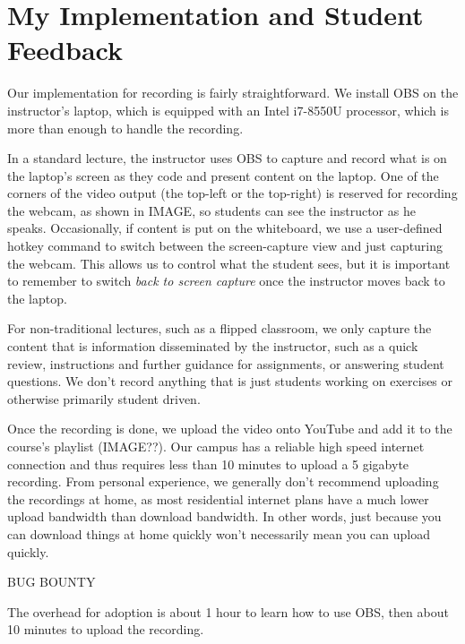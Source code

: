 \documentclass[sigconf]{acmart}
\begin{document}
\section{My Implementation and Student Feedback}
\label{implementation}

Our implementation for recording is fairly straightforward.
We install OBS \cite{bailey2017open} on the instructor's laptop, which is equipped with an Intel i7-8550U processor, which is more than enough to handle the recording.

In a standard lecture, the instructor uses OBS to capture and record what is on the laptop's screen as they code and present content on the laptop.
One of the corners of the video output (the top-left or the top-right) is reserved for recording the webcam, as shown in IMAGE, so students can see the instructor as he speaks.
Occasionally, if content is put on the whiteboard, we use a user-defined hotkey command to switch between the screen-capture view and just capturing the webcam.
This allows us to control what the student sees, but it is important to remember to switch \textit{back to screen capture} once the instructor moves back to the laptop.  

For non-traditional lectures, such as a flipped classroom, we only capture the content that is information disseminated by the instructor, such as a quick review, instructions and further guidance for assignments, or answering student questions.
We don't record anything that is just students working on exercises or otherwise primarily student driven.

Once the recording is done, we upload the video onto YouTube and add it to the course's playlist (IMAGE??).
Our campus has a reliable high speed internet connection and thus requires less than 10 minutes to upload a 5 gigabyte recording.
From personal experience, we generally don't recommend uploading the recordings at home, as most residential internet plans have a much lower upload bandwidth than download bandwidth.
In other words, just because you can download things at home quickly won't necessarily mean you can upload quickly.

BUG BOUNTY


The overhead for adoption is about 1 hour to learn how to use OBS, then about 10 minutes to upload the recording.



\end{document}

